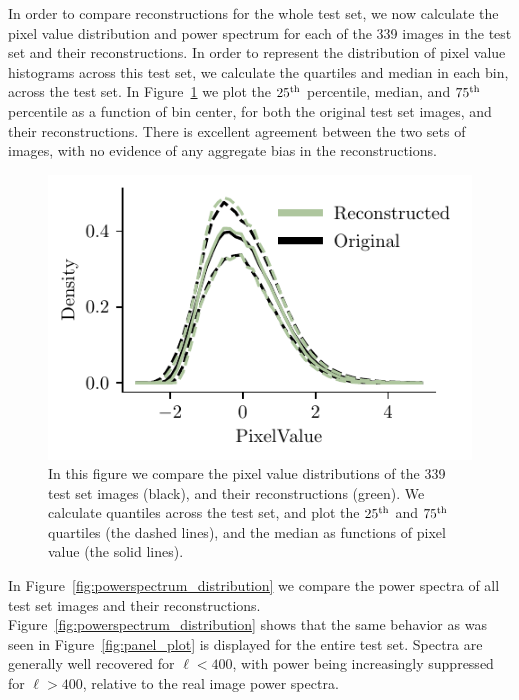 \documentclass[fleqn,usenatbib]{mnras}
\begin{document}
In order to compare reconstructions for the whole test set, we now calculate the pixel value distribution and power spectrum for each of the 339 images in the test set and their reconstructions. In order to represent the distribution of pixel value histograms across this test set, we calculate the quartiles and median in each bin, across the test set. In Figure~\ref{fig:histogram_distribution} we plot the $25^{\rm th}$ percentile, median, and $75^{\rm th}$ percentile as a function of bin center, for both the original test set images, and their reconstructions. There is excellent agreement between the two sets of images, with no evidence of any aggregate bias in the reconstructions.
\begin{figure}
    \centering
    \includegraphics{ ./histogram_distribution.pdf}
    \caption{In this figure we compare the pixel value distributions of the 339 test set images (black), and their reconstructions (green). We calculate quantiles across the test set, and plot the $25^{\rm th}$ and $75^{\rm th}$ quartiles (the dashed lines), and the median as functions of pixel value (the solid lines).}
    \label{fig:histogram_distribution}
\end{figure}
In Figure~\ref{fig:powerspectrum_distribution} we compare the power spectra of all test set images and their reconstructions. Figure~\ref{fig:powerspectrum_distribution} shows that the same behavior as was seen in Figure~\ref{fig:panel_plot} is displayed for the entire test set. Spectra are generally well recovered for $\ell < 400$, with power being increasingly suppressed for $\ell > 400$, relative to the real image power spectra.
\end{document}
